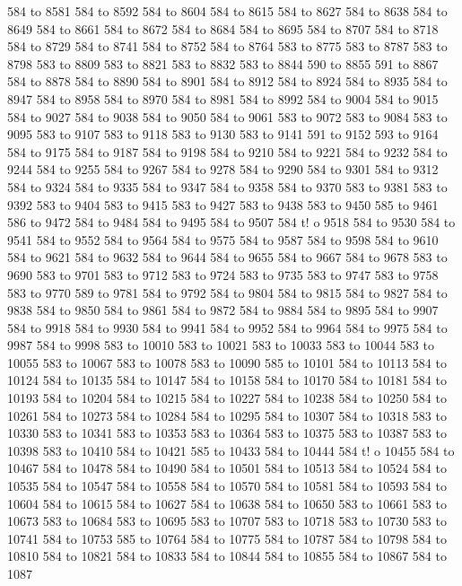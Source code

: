 584 to 8581 584 to 8592 584 to 8604 584 to 8615 584 to 8627 584 to 8638 584 to 8649 584 to 8661 584 to 8672 584 to 8684 584 to 8695 584 to 8707 584 to 8718 584 to 8729 584 to 8741 584 to 8752 584 to 8764 583 to 8775 583 to 8787 583 to 8798 583 to 8809 583 to 8821 583 to 8832 583 to 8844 590 to 8855 591 to 8867 584 to 8878 584 to 8890 584 to 8901 584 to 8912 584 to 8924 584 to 8935 584 to 8947 584 to 8958 584 to 8970 584 to 8981 584 to 8992 584 to 9004 584 to 9015 584 to 9027 584 to 9038 584 to 9050 584 to 9061 583 to 9072 583 to 9084 583 to 9095 583 to 9107 583 to 9118 583 to 9130 583 to 9141 591 to 9152 593 to 9164 584 to 9175 584 to 9187 584 to 9198 584 to 9210 584 to 9221 584 to 9232 584 to 9244 584 to 9255 584 to 9267 584 to 9278 584 to 9290 584 to 9301 584 to 9312 584 to 9324 584 to 9335 584 to 9347 584 to 9358 584 to 9370 583 to 9381 583 to 9392 583 to 9404 583 to 9415 583 to 9427 583 to 9438 583 to 9450 585 to 9461 586 to 9472 584 to 9484 584 to 9495 584 to 9507 584 t!
o 9518 584 to 9530 584 to 9541 584
 to 9552 584 to 9564 584 to 9575 584 to 9587 584 to 9598 584 to 9610 584 to 9621 584 to 9632 584 to 9644 584 to 9655 584 to 9667 584 to 9678 583 to 9690 583 to 9701 583 to 9712 583 to 9724 583 to 9735 583 to 9747 583 to 9758 583 to 9770 589 to 9781 584 to 9792 584 to 9804 584 to 9815 584 to 9827 584 to 9838 584 to 9850 584 to 9861 584 to 9872 584 to 9884 584 to 9895 584 to 9907 584 to 9918 584 to 9930 584 to 9941 584 to 9952 584 to 9964 584 to 9975 584 to 9987 584 to 9998 583 to 10010 583 to 10021 583 to 10033 583 to 10044 583 to 10055 583 to 10067 583 to 10078 583 to 10090 585 to 10101 584 to 10113 584 to 10124 584 to 10135 584 to 10147 584 to 10158 584 to 10170 584 to 10181 584 to 10193 584 to 10204 584 to 10215 584 to 10227 584 to 10238 584 to 10250 584 to 10261 584 to 10273 584 to 10284 584 to 10295 584 to 10307 584 to 10318 583 to 10330 583 to 10341 583 to 10353 583 to 10364 583 to 10375 583 to 10387 583 to 10398 583 to 10410 584 to 10421 585 to 10433 584 to 10444 584 t!
o 10455 584 to 10467 584 to 10478 
584 to 10490 584 to 10501 584 to 10513 584 to 10524 584 to 10535 584 to 10547 584 to 10558 584 to 10570 584 to 10581 584 to 10593 584 to 10604 584 to 10615 584 to 10627 584 to 10638 584 to 10650 583 to 10661 583 to 10673 583 to 10684 583 to 10695 583 to 10707 583 to 10718 583 to 10730 583 to 10741 584 to 10753 585 to 10764 584 to 10775 584 to 10787 584 to 10798 584 to 10810 584 to 10821 584 to 10833 584 to 10844 584 to 10855 584 to 10867 584 to 1087
